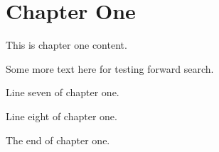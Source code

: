 \section{Chapter One}

This is chapter one content.

Some more text here for testing forward search.

Line seven of chapter one.

Line eight of chapter one.

The end of chapter one.
